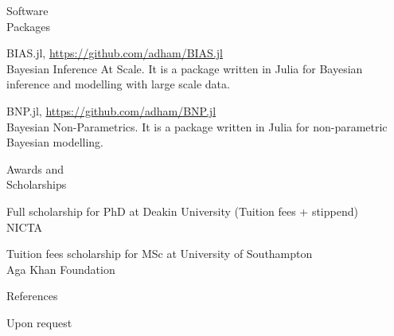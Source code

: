 \documentclass[10pt,letterpaper]{article}
\renewenvironment{itemize}{
  \begin{list}{}{
    \setlength{\leftmargin}{1.5em}
    \setlength{\itemsep}{0.25em}
    \setlength{\parskip}{0pt}
    \setlength{\parsep}{0.25em}
  }
}{
  \end{list}
}
\begin{document}
\begin{minipage}[t]{0.195\textwidth}
Software \\
Packages 
\end{minipage}
\begin{minipage}[t]{0.795\textwidth}
\begin{itemize}
\item BIAS.jl, \href{https://github.com/adham/BIAS.jl}{https://github.com/adham/BIAS.jl} \\
Bayesian Inference At Scale. It is a package written in Julia for Bayesian inference and modelling with large scale data. 
\item BNP.jl, \href{https://github.com/adham/BNP.jl}{https://github.com/adham/BNP.jl} \\
Bayesian Non-Parametrics. It is a package written in Julia for non-parametric Bayesian modelling.
\end{itemize}
\end{minipage}


\bigskip
\bigskip

\begin{minipage}[t]{0.195\textwidth}
Awards and \\
Scholarships
\end{minipage}
\begin{minipage}[t]{0.8\textwidth}
\begin{itemize}
\item Full scholarship for PhD at Deakin University (Tuition fees + stippend) \\
NICTA
\item Tuition fees scholarship for MSc at University of Southampton \\
Aga Khan Foundation

\end{itemize}
\end{minipage}


\bigskip
\bigskip

\begin{minipage}[t]{0.195\textwidth}
References
\end{minipage}
\begin{minipage}[t]{0.8\textwidth}
\begin{itemize}
\item Upon request

\end{itemize}
\end{minipage}



\end{document}
